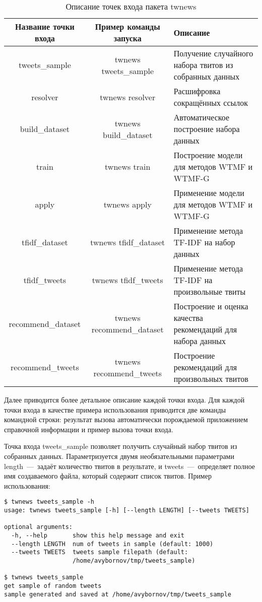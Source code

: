          \begin{table}[h!]
            \small
            \caption{Описание точек входа пакета twnews \bigskip}
            \center

            \label{tabular:entry_point}
            \begin{tabular}{|c|c|m{7cm}|}
                \hline
                \bf{Название точки входа} & \bf{Пример команды запуска} & \bf{Описание} \\ \hline
                tweets\_sample & twnews tweets\_sample & Получение случайного набора твитов из собранных данных \\ \hline
                resolver & twnews resolver & Расшифровка сокращённых ссылок \\ \hline
                build\_dataset & twnews build\_dataset & Автоматическое построение набора данных \\ \hline
                train & twnews train & Построение модели для методов WTMF и WTMF-G \\ \hline
                apply & twnews apply & Применение модели для методов WTMF и WTMF-G \\ \hline
                tfidf\_dataset & twnews tfidf\_dataset & Применение метода TF-IDF на набор данных \\ \hline
                tfidf\_tweets & twnews tfidf\_tweets & Применение метода TF-IDF на произвольные твиты\\ \hline
                recommend\_dataset & twnews recommend\_dataset & Построение и оценка качества рекомендаций для набора данных \\ \hline
                recommend\_tweets & twnews recommend\_tweets & Построение рекомендаций для произвольных твитов \\ \hline
            \end{tabular}
        \end{table}
        Далее приводится более детальное описание каждой точки входа. Для каждой точки входа в качестве примера использования
        приводится две команды командной строки: результат вызова автоматически порождаемой приложением справочной информации и пример вызова точки входа.


        Точка входа tweets\_sample позволяет получить случайный набор твитов из собранных данных. Параметризуется двумя необязательными параметрами
        length~---~задаёт количество твитов в результате, и tweets~---~определяет полное имя создаваемого файла, который содержит список твитов.
        Пример использования:
        \begin{lstlisting}
$ twnews tweets_sample -h
usage: twnews tweets_sample [-h] [--length LENGTH] [--tweets TWEETS]

optional arguments:
  -h, --help       show this help message and exit
  --length LENGTH  num of tweets in sample (default: 1000)
  --tweets TWEETS  tweets sample filepath (default:
                   /home/avybornov/tmp/tweets_sample)

$ twnews tweets_sample
get sample of random tweets
sample generated and saved at /home/avybornov/tmp/tweets_sample
        \end{lstlisting}

